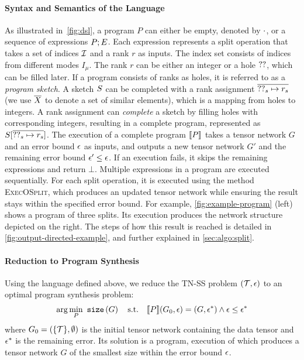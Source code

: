 \paragraph{Syntax and Semantics of the Language}
%
As illustrated in~\cref{fig:dsl}, a program $P$ can either be empty, denoted by $\cdot$, or a sequence of expressions $P;E$.
%
Each expression represents a split operation that takes a set of indices $\mathcal{I}$ and a rank $r$ as inputs.
%
The index set consists of indices from different modes $I_\mu$.
%
The rank $r$ can be either an integer or a hole $??$, which can be filled later.
%
If a program consists of ranks as holes, it is referred to as a \emph{program sketch}.
%
A sketch $S$ can be completed with a rank assignment $\overline{??_s \mapsto r_s}$ (we use $\overline{X}$ to denote a set of similar elements), which is a mapping from holes to integers.
%
A rank assignment can \emph{complete} a sketch by filling holes with corresponding integers, resulting in a complete program, represented as $S[\overline{??_s \mapsto r_s}]$.
%
The execution of a complete program $\llbracket P \rrbracket$ takes a tensor network $G$ and an error bound $\epsilon$ as inputs, and outputs a new tensor network $G'$ and the remaining error bound $\epsilon' \leq \epsilon$.
%
If an execution fails, it skips the remaining expressions and return $\bot$.
%
Multiple expressions in a program are executed sequentially.
%
For each split operation, it is executed using the method \textsc{ExecOSplit}, which produces an updated tensor network while ensuring the result stays within the specified error bound.
%
For example, \cref{fig:example-program} (left) shows a program of three splits.
%
Its execution produces the network structure depicted on the right.
%
The steps of how this result is reached is detailed in \cref{fig:output-directed-example}, and further explained in \cref{sec:algo:split}.

\paragraph{Reduction to Program Synthesis}
%
Using the language defined above, we reduce the TN-SS problem $(\mathcal{T}, \epsilon)$ to an optimal program synthesis problem:
\begin{align*}
\arg\min_{P}~\mathtt{size}\left(G\right) \quad
\textrm{s.t.} \quad \llbracket P \rrbracket(G_0, \epsilon) = (G, \epsilon^{*}) \land \epsilon \leq \epsilon^{*}
\end{align*}
where $G_0 = (\{\mathcal{T}\}, \emptyset)$ is the initial tensor network containing the data tensor and $\epsilon^{*}$ is the remaining error.
%
Its solution is a program, execution of which produces a tensor network $G$ of the smallest size within the error bound $\epsilon$.

